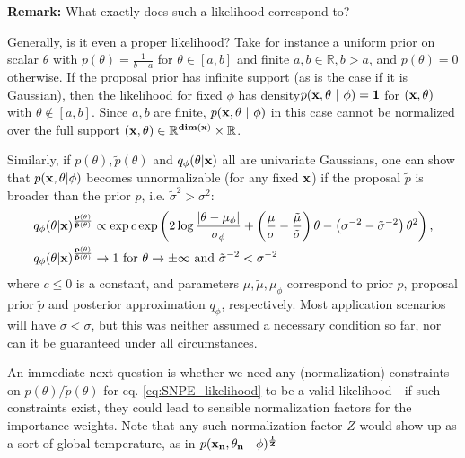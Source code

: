\documentclass[10pt,english]{article}
\begin{document}
\begin{framed}
\noindent{}\textbf{Remark:} What exactly does such a likelihood correspond to? 

Generally, is it even a proper likelihood? 
Take for instance a uniform prior on scalar $\theta$ with $p(\theta) = \frac{1}{b-a}$ for $\theta \in [a,b]$ and finite $a,b\in\mathbb{R}, b>a$, and $p(\theta) = 0$ otherwise. 
If the proposal prior has infinite support (as is the case if it is Gaussian), then the likelihood for fixed $\phi$ has density$p(\bf{x}, \theta \ | \ \phi) = 1$
for $(\bf{x}, \theta)$ with $\theta \notin [a,b]$.
Since $a,b$ are finite, $p(\bf{x}, \theta \ | \ \phi)$ in this case cannot be normalized over the full support $(\bf{x}, \theta) \in \mathbb{R}^{dim(\bf{x})} \times \mathbb{R}$. 

Similarly, if $p(\theta), \tilde{p}(\theta)$ and $q_\phi(\theta|\bf{x})$ all are univariate Gaussians, one can show that $p(\bf{x},\theta | \phi)$ becomes unnormalizable (for any fixed $\bf{x}$) if the proposal $\tilde{p}$ is broader than the prior $p$, i.e. $\tilde{\sigma}^2 > \sigma^2$:
\begin{align}
q_\phi(\theta | \bf{x})^\frac{p(\theta)}{\tilde{p}(\theta)} &\propto \exp c \exp \left( 2 \log \frac{|\theta - \mu_{\phi}|}{\sigma_{\phi}} + \left(\frac{\mu}{\sigma} - \frac{\tilde{\mu}}{\tilde{\sigma}}\right) \theta - \left(\sigma^{-2} - \tilde{\sigma}^{-2} \right) \theta^2 \right) \nonumber, \\
q_\phi(\theta | \bf{x})^\frac{p(\theta)}{\tilde{p}(\theta)} &\rightarrow 1 \mbox{ for } \theta \rightarrow \pm \infty \nonumber \mbox{ and } \tilde{\sigma}^{-2} < \sigma^{-2}
\end{align}
where $c \leq 0$ is a constant, and parameters $\mu, \tilde{\mu}, \mu_\phi$ correspond to prior $p$, proposal prior $\tilde{p}$ and posterior approximation $q_\phi$, respectively.
Most application scenarios will have $\tilde{\sigma} < \sigma$, but this was neither assumed a necessary condition so far, nor can it be guaranteed under all circumstances. 

An immediate next question is whether we need any (normalization) constraints on $p(\theta)/\tilde{p}(\theta)$ for eq. \ref{eq:SNPE_likelihood} to be a valid likelihood - if such constraints exist, they could lead to sensible normalization factors for the importance weights. 
Note that any such normalization factor $Z$ would show up as a sort of global temperature, as in $p( \bf{x}_n, \theta_n \ | \ \phi)^{\frac{1}{Z}}$
\end{framed}
\end{document}
